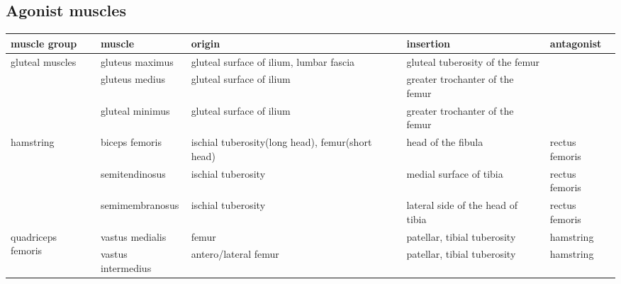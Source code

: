 \documentclass[a4paper,10pt]{article}
\begin{document}
\begin{landscape}
\subsection{Agonist muscles}
\begin{scriptsize}
\begin{tabular}{|l|l|p{4cm}|p{4cm}|l|}
  muscle group      & muscle                    & origin                                                  & insertion                                                 & antagonist         \\
  \hline
  \multirow{3}{*}{gluteal muscles}   & gluteus maximus           & gluteal surface of ilium, lumbar fascia                 & gluteal tuberosity of the femur                           &                    \\
                    & gluteus medius            & gluteal surface of ilium                                & greater trochanter of the femur                           &                    \\
                    & gluteal minimus           & gluteal surface of ilium                                & greater trochanter of the femur                           &                    \\
  \hline
  \multirow{3}{*}{hamstring}         & biceps femoris            & ischial tuberosity(long head), femur(short head)        & head of the fibula                                        & rectus femoris     \\
                    & semitendinosus            & ischial tuberosity                                      & medial surface of tibia                                   & rectus femoris     \\
                    & semimembranosus           & ischial tuberosity                                      & lateral side of the head of tibia                         & rectus femoris     \\
  \hline
  \multirow{4}{*}{quadriceps femoris}& vastus medialis           & femur                                                   & patellar, tibial tuberosity                               & hamstring          \\
                    & vastus intermedius        & antero/lateral femur                                    & patellar, tibial tuberosity                               & hamstring          \\

\end{tabular}
\end{scriptsize}
\end{landscape}
\end{document}
